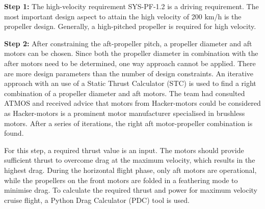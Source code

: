 \noindent \textbf{Step 1:} The high-velocity requirement SYS-PF-1.2 is a driving requirement. The most important design aspect to attain the high velocity of 200 km/h is the propeller design. Generally, a high-pitched propeller is required for high velocity.\\



\noindent \textbf{Step 2:} After constraining the aft-propeller pitch, a propeller diameter and aft motors can be chosen. Since both the propeller diameter in combination with the after motors need to be determined, one way approach cannot be applied. There are more design parameters than the number of design constraints. An iterative approach with an use of a Static Thrust Calculator (STC) is used to find a right combination of a propeller diameter and aft motors. The team had consulted ATMOS and received advice that motors from Hacker-motors could be considered as Hacker-motors is a prominent motor manufacturer specialised in brushless motors. After a series of iterations, the right aft motor-propeller combination is found.



For this step, a required thrust value is an input. The motors should provide sufficient thrust to overcome drag at the maximum velocity, which results in the highest drag. During the horizontal flight phase, only aft motors are operational, while the propellers on the front motors are folded in a feathering mode to minimise drag. To calculate the required thrust and power for maximum velocity cruise flight, a Python Drag Calculator (PDC) tool is used.\\ %

